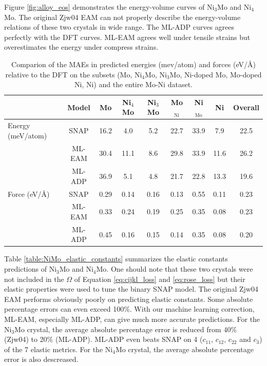 \documentclass[prb,reprint,superscriptaddress]{revtex4-2}
\begin{document}
Figure \ref{fig:alloy_eos} demonstrates the energy-volume curves of Ni$_3$Mo and
Ni$_4$Mo. The original Zjw04 EAM can not properly describe the energy-volume 
relations of these two crystals in wide range. The ML-ADP curves agrees 
perfectly with the DFT curves. ML-EAM agrees well under tensile strains but 
overestimates the energy under compress strains. 

% 
%
\begin{table}
\centering
\begin{tabular}{lcccccccc}
\hline
                  & Model            & Mo   & Ni$_4$Mo & Ni$_3$Mo & Mo$_{\mathrm{Ni}}$ & Ni$_{\mathrm{Mo}}$ & Ni   & Overall \\
\hline
Energy (meV/atom) & SNAP \cite{SNAP} & 16.2 & 4.0      & 5.2      & 22.7               & 33.9               & 7.9  & 22.5    \\
                  & ML-EAM           & 30.4 & 11.1     & 8.6      & 29.8               & 33.9               & 11.6 & 26.2    \\
                  & ML-ADP           & 36.9 & 5.1      & 4.8      & 21.7               & 22.8               & 13.3 & 19.6    \\
\hline
Force (eV/\AA)    & SNAP \cite{SNAP} & 0.29 & 0.14     & 0.16     & 0.13               & 0.55               & 0.11 & 0.23    \\
                  & ML-EAM           & 0.33 & 0.24     & 0.19     & 0.25               & 0.35               & 0.08 & 0.23    \\
                  & ML-ADP           & 0.45 & 0.16     & 0.15     & 0.14               & 0.35               & 0.08 & 0.20    \\
\hline
\end{tabular}
\caption{\label{table:MAE}
Comparion of the MAEs in predicted energies (mev/atom) and forces (eV/\AA) 
relative to the DFT on the subsets (Mo, Ni$_4$Mo, Ni$_3$Mo, Ni-doped Mo, 
Mo-doped Ni, Ni) and the entire Mo-Ni dataset.}
\end{table}

Table \ref{table:NiMo_elastic_constants} summarizes the elastic constants 
predictions of Ni$_3$Mo and Ni$_4$Mo. One should note that these two crystals 
were not included in the $\Omega$ of Equation \ref{eq:cijkl_loss} and 
\ref{eq:rose_loss} but their elastic properties were used to tune the binary 
SNAP model. The original Zjw04 EAM performs obviously poorly on predicting 
elastic constants. Some absolute percentage errors can even exceed 100\%. With 
our machine learning correction, ML-EAM, especially ML-ADP, can give much more  
accurate predictions. For the Ni$_3$Mo crystal, the average absolute percentage 
error is reduced from 40\% (Zjw04) to 20\% (ML-ADP). ML-ADP even beats SNAP on 4 
($c_{11}$, $c_{12}$, $c_{22}$ and $c_{3}$) of the 7 elastic metrics. For the 
Ni$_4$Mo crystal, the average absolute percentage error is also descreased. 
\end{document}

